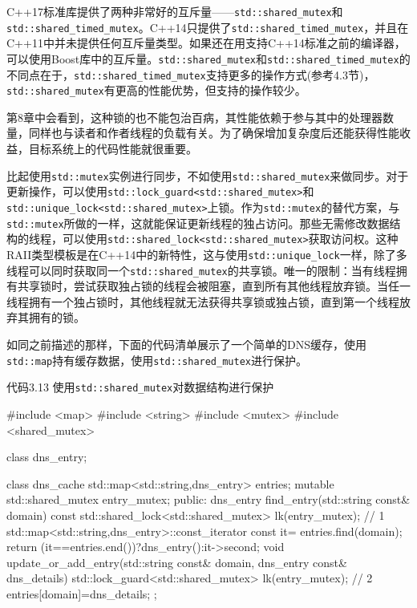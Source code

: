 C++17标准库提供了两种非常好的互斥量——\texttt{std::shared\_mutex}和\texttt{std::shared\_timed\_mutex}。C++14只提供了\texttt{std::shared\_timed\_mutex}，并且在C++11中并未提供任何互斥量类型。如果还在用支持C++14标准之前的编译器，可以使用Boost库中的互斥量。\texttt{std::shared\_mutex}和\texttt{std::shared\_timed\_mutex}的不同点在于，\texttt{std::shared\_timed\_mutex}支持更多的操作方式(参考4.3节)，\texttt{std::shared\_mutex}有更高的性能优势，但支持的操作较少。

第8章中会看到，这种锁的也不能包治百病，其性能依赖于参与其中的处理器数量，同样也与读者和作者线程的负载有关。为了确保增加复杂度后还能获得性能收益，目标系统上的代码性能就很重要。

比起使用\texttt{std::mutex}实例进行同步，不如使用\texttt{std::shared\_mutex}来做同步。对于更新操作，可以使用\texttt{std::lock\_guard<std::shared\_mutex>}和\texttt{std::unique\_lock<std::shared\_mutex>}上锁。作为\texttt{std::mutex}的替代方案，与\texttt{std::mutex}所做的一样，这就能保证更新线程的独占访问。那些无需修改数据结构的线程，可以使用\texttt{std::shared\_lock<std::shared\_mutex>}获取访问权。这种RAII类型模板是在C++14中的新特性，这与使用\texttt{std::unique\_lock}一样，除了多线程可以同时获取同一个\texttt{std::shared\_mutex}的共享锁。唯一的限制：当有线程拥有共享锁时，尝试获取独占锁的线程会被阻塞，直到所有其他线程放弃锁。当任一线程拥有一个独占锁时，其他线程就无法获得共享锁或独占锁，直到第一个线程放弃其拥有的锁。

如同之前描述的那样，下面的代码清单展示了一个简单的DNS缓存，使用\texttt{std::map}持有缓存数据，使用\texttt{std::shared\_mutex}进行保护。

代码3.13 使用\texttt{std::shared\_mutex}对数据结构进行保护

\begin{cpp}
#include <map>
#include <string>
#include <mutex>
#include <shared_mutex>

class dns_entry;

class dns_cache
{
  std::map<std::string,dns_entry> entries;
  mutable std::shared_mutex entry_mutex;
public:
  dns_entry find_entry(std::string const& domain) const
  {
    std::shared_lock<std::shared_mutex> lk(entry_mutex);  // 1
    std::map<std::string,dns_entry>::const_iterator const it=
       entries.find(domain);
    return (it==entries.end())?dns_entry():it->second;
  }
  void update_or_add_entry(std::string const& domain,
                           dns_entry const& dns_details)
  {
    std::lock_guard<std::shared_mutex> lk(entry_mutex);  // 2
    entries[domain]=dns_details;
  }
};
\end{cpp}

